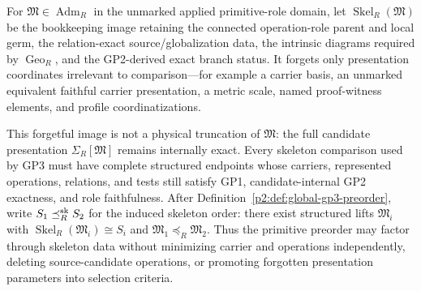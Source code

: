 \documentclass[12pt,a4paper]{article}
\begin{document}
\begin{definition}
\label{p2:def:primitive-role-skeleton}
For \(\mathfrak M\in\operatorname{Adm}_R\) in the unmarked applied
primitive-role domain, let \(\operatorname{Skel}_R(\mathfrak M)\) be the
bookkeeping image retaining the connected operation-role parent and local germ,
the relation-exact source/globalization data, the intrinsic diagrams required
by \(\operatorname{Geo}_R\), and the GP2-derived exact branch status.  It
forgets only presentation coordinates irrelevant to comparison---for example
a carrier basis, an unmarked equivalent faithful carrier presentation, a
metric scale, named proof-witness elements, and profile coordinatizations.

This forgetful image is not a physical truncation of \(\mathfrak M\): the full
candidate presentation \(\Sigma_R[\mathfrak M]\) remains internally exact.
Every skeleton comparison used by GP3 must have complete structured endpoints
whose carriers, represented operations, relations, and tests still satisfy
GP1, candidate-internal GP2 exactness, and role faithfulness.  After
Definition~\ref{p2:def:global-gp3-preorder}, write
\(S_1\preceq_R^{\rm sk}S_2\) for the induced skeleton order: there exist
structured lifts \(\mathfrak M_i\) with
\(\operatorname{Skel}_R(\mathfrak M_i)\cong S_i\) and
\(\mathfrak M_1\preceq_R\mathfrak M_2\).  Thus the primitive preorder may
factor through skeleton data without minimizing carrier and operations
independently, deleting source-candidate operations, or promoting forgotten
presentation parameters into selection criteria.
\end{definition}
\end{document}
